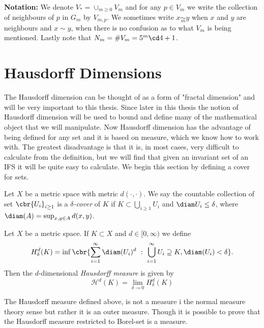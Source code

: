 \textbf{Notation:} We denote $V_{\ast} = \cup_{m \geq 0} V_m$ and for any $p \in V_m$ we write the collection of neighbours of $p$ in $G_m$ by $V_{m,p}$. We sometimes write $x \underset{m}{\sim} y$ when $x$ and $y$ are neighbours and $x \sim y$, when there is no confusion as to what $V_m$ is being mentioned. Lastly note that $N_m = \# V_m = 5^{m}\cd 4 + 1$.



\section{Hausdorff Dimensions}

The Hausdorff dimension can be thought of as a form of "fractal dimension" and will be very important to this thesis. Since later in this thesis the notion of Hausdorff dimension will be used to bound and define many of the mathematical object that we will manipulate. Now Hausdorff dimension has the advantage of being defined for any set and it is based on measure, which we know how to work with. The greatest disadvantage is that it is, in most cases, very difficult to calculate from the definition, but we will find that given an invariant set of an IFS it will be quite easy to calculate. We begin this section by defining a cover for sets.

\begin{defi}\label{deltaCover}
	Let $X$ be a metric space with metric $d(\cdot, \cdot)$. We say the countable collection of set $\cbr{U_i}_{i \geq 1}$ is a \emph{$\delta$-cover} of $K$ if $K \subset \bigcup_{i \geq 1} U_i$ and $\diam U_i \leq \delta$, where $\diam(A)= \sup_{x, y \in A}d(x,y)$.
\end{defi}


\begin{defi}
	Let $X$ be a metric space. If $K \subset X$ and $d \in [0, \infty)$ we define
	\begin{equation}
		H^{d}_{\delta}(K) = \inf \cbr{\sum_{i =1}^{\infty} \diam(U_i)^d \ : \ \bigcup_{i = 1}^{\infty} U_i \supseteq K, \diam(U_i) < \delta}.
	\end{equation}
	Then the $d$-dimensional \emph{Hausdorff measure} is given by
	\begin{equation}
		\mathcal{H}^d(K) = \lim_{\delta \to 0} H^{d}_{\delta}(K)
	\end{equation}
\end{defi}

\begin{remark*}
	The Hausdorff measure defined above, is not a measure i the normal measure theory sense but rather it is an outer measure. Though it is possible to prove that the Hausdorff measure restricted to Borel-set is a measure.
\end{remark*}

